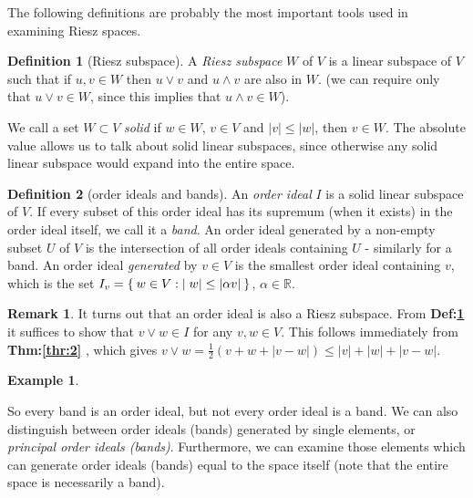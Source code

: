 \documentclass[letterpaper,10pt,oneside,onecolumn,reqno]{amsart}
\newcommand{\R}{\mathbb R}
\theoremstyle{definition}
\newtheorem{defn}{Definition}
\newtheorem{rem}{Remark}
\newtheorem{exa}[thm]{Example}
\newcommand{\meet}{\wedge}
\newcommand{\join}{\vee}
\begin{document}
The following definitions are probably the most important tools used
in examining Riesz spaces.
\begin{framed}
  \begin{defn}[Riesz subspace]\label{def:9}
    A \emph{Riesz subspace} $W$ of $V$ is a
    linear subspace of $V$ such that if $u,v \in W$ then $u \join v$
    and $u \meet v$ are also in $W$. (we can require only that $u
    \join v \in W$, since this implies that $u \meet v \in W$).
  \end{defn}
  We call a set $W \subset V$ \emph{solid} if $w \in W$, $v \in V$ and
  $|v| \leq |w|$, then $v \in W$. The absolute value allows us to talk
  about solid linear subspaces, since otherwise any solid linear
  subspace would expand into the entire space.

  \begin{defn}[order ideals and bands]\label{def:10}
    An \emph{order ideal} $I$ is a solid linear subspace of
    $V$. If every subset of this order ideal has its supremum (when it
    exists) in the order ideal itself, we call it a
    \emph{band}. An order ideal generated by a non-empty subset
    $U$ of $V$ is the intersection of all order ideals containing $U$ -
    similarly for a band. An order ideal \emph{generated} by $v \in V$ is
    the smallest order ideal containing $v$, which is the set $I_{v} =
    \Set{w \in V: |w| \leq |\alpha v|}$, $\alpha \in \R$.
  \end{defn}

  \begin{rem}\label{rem:1}
    It turns out that an order ideal is also a Riesz subspace. From
    \textbf{Def:\ref{def:9}} it suffices to show that $v \join w \in
    I$ for any $v,w \in V$. This follows immediately from
    \textbf{Thm:\ref{thr:2}} , which gives $v \join w =
    \frac{1}{2}(v+w+|v-w|) \leq |v| + |w| + |v - w|$.
  \end{rem}
\end{framed}

\begin{exa}

\end{exa}

So every band is an order ideal, but not every order ideal is a band. We can also
distinguish between order ideals (bands) generated by single elements, or
\emph{principal order ideals (bands)}. Furthermore, we can examine those
elements which can generate order ideals (bands) equal to the space itself
(note that the entire space is necessarily a band).
\end{document}
